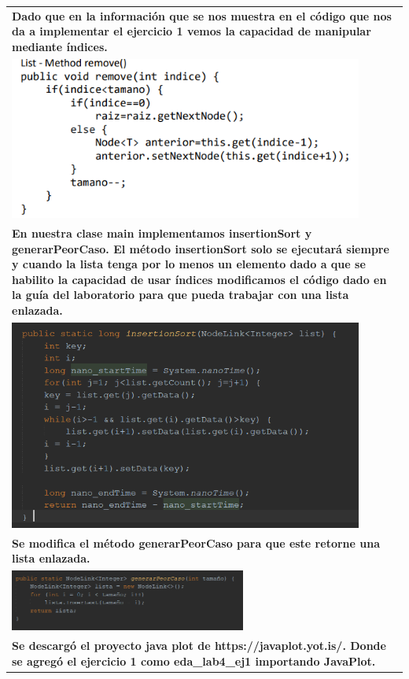 \documentclass[9pt]{article}
\begin{document}
\begin{longtable}{|p{15cm}|}
		\textbf{Dado que en la información que se nos muestra en el código que nos da a implementar el ejercicio 1 vemos la capacidad de manipular mediante índices.}\\
		\includegraphics[width=0.9\textwidth,keepaspectratio]{img/remove.png}\\
		\textbf{En nuestra clase main implementamos insertionSort y generarPeorCaso. El método insertionSort solo se ejecutará siempre y cuando la lista tenga por lo menos un elemento dado a que se habilito la capacidad de usar índices modificamos el código dado en la guía del laboratorio para que pueda trabajar con una lista enlazada.}\\
		\includegraphics[width=0.9\textwidth,keepaspectratio]{img/insercion.png}\\
		\textbf{Se modifica el método generarPeorCaso para que este retorne una lista enlazada.}\\
		\includegraphics[width=0.6\textwidth,keepaspectratio]{img/peorcaso.png}\\
		\textbf{Se descargó el proyecto java plot de https://javaplot.yot.is/. Donde se agregó el ejercicio 1 como eda\_lab4\_ej1 importando JavaPlot.}\\

\end{longtable}
\end{document}

